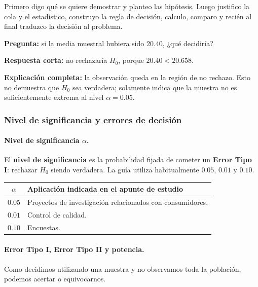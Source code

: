 \documentclass[11pt,a4paper]{article}
\begin{document}
\begin{oral}
Primero digo qué se quiere demostrar y planteo las hipótesis. Luego justifico la cola y el estadístico, construyo la regla de decisión, calculo, comparo y recién al final traduzco la decisión al problema.
\end{oral}

\begin{preguntaoral}
\textbf{Pregunta:} si la media muestral hubiera sido $20.40$, ¿qué decidiría?\par
\textbf{Respuesta corta:} no rechazaría $H_0$, porque $20.40<20.658$.\par
\textbf{Explicación completa:} la observación queda en la región de no rechazo. Esto no demuestra que $H_0$ sea verdadera; solamente indica que la muestra no es suficientemente extrema al nivel $\alpha=0.05$.
\end{preguntaoral}

\subsubsection{Nivel de significancia y errores de decisión}

\paragraph{Nivel de significancia $\alpha$.}

El \textbf{nivel de significancia} es la probabilidad fijada de cometer un \textbf{Error Tipo I}: rechazar $H_0$ siendo verdadera. La guía utiliza habitualmente $0.05$, $0.01$ y $0.10$.

\begin{table}[H]
\centering
\begin{tabular}{cl}
\toprule
$\alpha$ & Aplicación indicada en el apunte de estudio \\
\midrule
$0.05$ & Proyectos de investigación relacionados con consumidores.\\
$0.01$ & Control de calidad.\\
$0.10$ & Encuestas.\\
\bottomrule
\end{tabular}
\end{table}

\paragraph{Error Tipo I, Error Tipo II y potencia.}

Como decidimos utilizando una muestra y no observamos toda la población, podemos acertar o equivocarnos.
\end{document}
